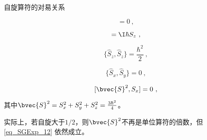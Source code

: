 \begin{theorem}{自旋算符的对易关系}

\begin{equation}
[\hat{S}_z, \hat{S}_z]=0~,
\end{equation}

\begin{equation}
[\hat{S}_x, \hat{S}_y]=\I\hbar S_z~,
\end{equation}

\begin{equation}\label{eq_SGExp_11}
\{\hat{S}_z, \hat{S}_z\}=\frac{\hbar^2}{2}~,
\end{equation}

\begin{equation}
\{\hat{S}_x, \hat{S}_y\}=0~,
\end{equation}

\begin{equation}\label{eq_SGExp_12}
[\bvec{S}^2, S_x]=0~,
\end{equation}

其中$\bvec{S}^2=S_x^2+S_y^2+S_z^2=\frac{3\hbar^2}{4}$。

\end{theorem}

实际上，若自旋大于$1/2$，则$\bvec{S}^2$不再是单位算符的倍数，但\autoref{eq_SGExp_12} 依然成立。










